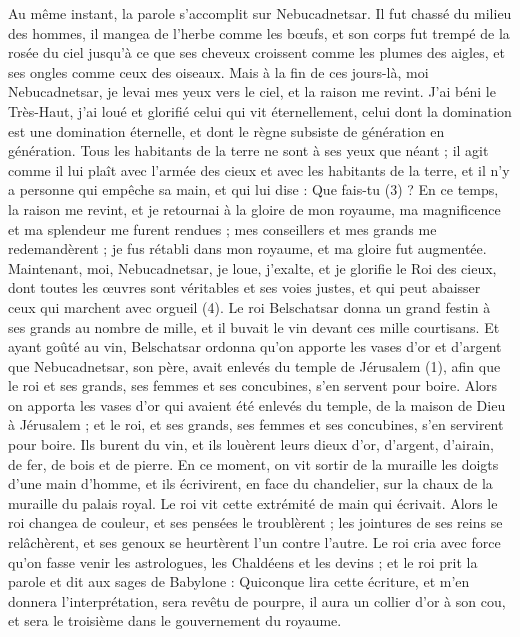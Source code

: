 \begin{multicols}{2}
Au même instant, la parole s’accomplit sur Nebucadnetsar. Il fut chassé du milieu des hommes, il mangea de l'herbe comme les bœufs, et son corps fut trempé de la rosée du ciel jusqu'à ce que ses cheveux croissent comme les plumes des aigles, et ses ongles comme ceux des oiseaux.
Mais à la fin de ces jours-là, moi Nebucadnetsar, je levai mes yeux vers le ciel, et la raison me revint. J’ai béni le Très-Haut, j’ai loué et glorifié celui qui vit éternellement, celui dont la domination est une domination éternelle, et dont le règne subsiste de génération en génération.
Tous les habitants de la terre ne sont à ses yeux que néant ; il agit comme il lui plaît avec l'armée des cieux et avec les habitants de la terre, et il n'y a personne qui empêche sa main, et qui lui dise : Que fais-tu (3) ?
En ce temps, la raison me revint, et je retournai à la gloire de mon royaume, ma magnificence et ma splendeur me furent rendues ; mes conseillers et mes grands me redemandèrent ; je fus rétabli dans mon royaume, et ma gloire fut augmentée.
Maintenant, moi, Nebucadnetsar, je loue, j'exalte, et je glorifie le Roi des cieux, dont toutes les œuvres sont véritables et ses voies justes, et qui peut abaisser ceux qui marchent avec orgueil (4).
\VerseOne{}Le roi Belschatsar donna un grand festin à ses grands au nombre de mille, et il buvait le vin devant ces mille courtisans.
Et ayant goûté au vin, Belschatsar ordonna qu’on apporte les vases d'or et d'argent que Nebucadnetsar, son père, avait enlevés du temple de Jérusalem (1), afin que le roi et ses grands, ses femmes et ses concubines, s’en servent pour boire.
Alors on apporta les vases d'or qui avaient été enlevés du temple, de la maison de Dieu à Jérusalem ; et le roi, et ses grands, ses femmes et ses concubines, s’en servirent pour boire.
Ils burent du vin, et ils louèrent leurs dieux d'or, d'argent, d'airain, de fer, de bois et de pierre.
En ce moment, on vit sortir de la muraille les doigts d'une main d'homme, et ils écrivirent, en face du chandelier, sur la chaux de la muraille du palais royal. Le roi vit cette extrémité de main qui écrivait.
Alors le roi changea de couleur, et ses pensées le troublèrent ; les jointures de ses reins se relâchèrent, et ses genoux se heurtèrent l'un contre l'autre.
Le roi cria avec force qu'on fasse venir les astrologues, les Chaldéens et les devins ; et le roi prit la parole et dit aux sages de Babylone : Quiconque lira cette écriture, et m’en donnera l’interprétation, sera revêtu de pourpre, il aura un collier d'or à son cou, et sera le troisième dans le gouvernement du royaume.

\end{multicols}
